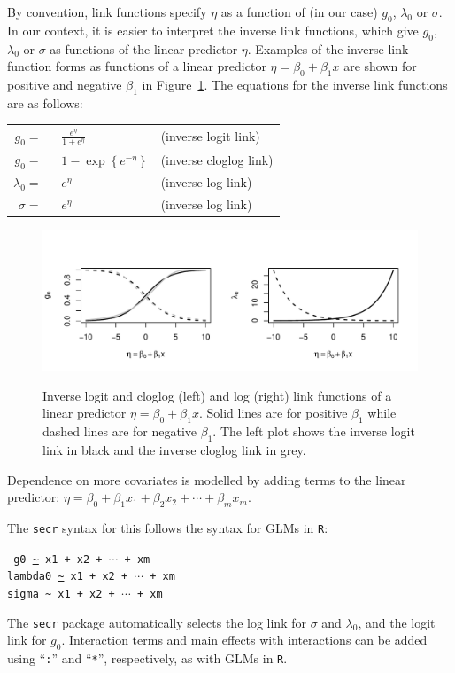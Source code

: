\documentclass[graybox,envcountchap,sectrefs]{SpringerStyleFiles/styles/svmono}\usepackage[]{graphicx}\usepackage[]{color}
\begin{document}
By convention, link functions specify $\eta$ as a function of (in our case) $g_0$, $\lambda_0$ or $\sigma$. In our context, it is easier to interpret the inverse link functions, which give $g_0$, $\lambda_0$ or $\sigma$ as functions of the linear predictor $\eta$. Examples of the inverse link function forms as functions of a linear predictor $\eta=\beta_0+\beta_1 x$ are shown for positive and negative $\beta_1$ in Figure~\ref{fig:ERdetfun.linkfuns}. The equations for the inverse link functions are as follows:
\begin{center}
\begin{tabular}{ rll } 
$g_0=\;$ & $\;\frac{e^\eta}{1+e^\eta}$ & (inverse logit link) \\
$g_0=\;$ & $\;1-\exp\left\{e^{-\eta}\right\}$ & (inverse cloglog link) \\
$\lambda_0=\;$ & $\;e^\eta$ & (inverse log link) \\
$\sigma=\;$ & $\;e^\eta$ & (inverse log link)
\end{tabular}
\end{center}


\begin{figure}[ht]
\caption{\small Inverse logit and cloglog (left) and log (right) link functions of a linear predictor $\eta=\beta_0+\beta_1 x$. Solid lines are for positive $\beta_1$ while dashed lines are for negative $\beta_1$. The left plot shows the inverse logit link in black and the inverse cloglog link in grey.}
\centering
\vspace{-24pt}
\includegraphics[width=12cm]{keepfigure/linkfuns.pdf}
\label{fig:ERdetfun.linkfuns}
\end{figure}

Dependence on more covariates is modelled by adding terms to the linear predictor: $\eta=\beta_0 + \beta_1 x_1 + \beta_2 x_2 + \cdots + \beta_m x_m$. 




The \texttt{secr} syntax for this follows the syntax for GLMs in \texttt{R}:
\noindent
{\small
\begin{svgraybox}
\texttt{
g0 \url{~} x1 + x2 + $\cdots$ + xm \\
lambda0 \url{~} x1 + x2 + $\cdots$ + xm \\
sigma \url{~} x1 + x2 + $\cdots$ + xm 
}
\end{svgraybox}
}
\noindent
The \texttt{secr} package automatically selects the log link for $\sigma$ and $\lambda_0$, and the logit link for $g_0$. Interaction terms and main effects with interactions can be added using ``\texttt{:}'' and ``\texttt{*}'', respectively, as with GLMs in \texttt{R}.
\end{document}
